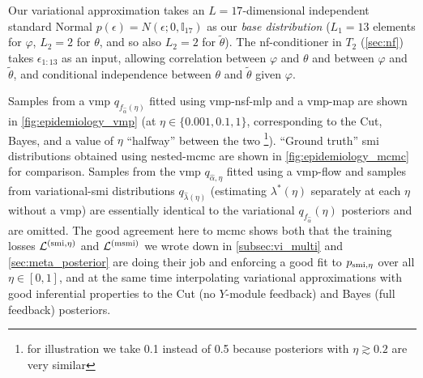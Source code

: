 Our variational approximation takes an $L=17$-dimensional independent standard Normal $p(\epsilon)=N(\epsilon; 0,\mathbb{I}_{17})$ as our \emph{base distribution} ($L_1=13$ elements for $\varphi$, $L_2=2$ for $\theta$, and so also $L_2=2$ for $\tilde\theta$).
The \acrshort*{nf}-conditioner in $T_2$ (\cref{sec:nf}) takes $\epsilon_{1:13}$ as an input, allowing correlation between $\varphi$ and $\theta$ and between $\varphi$ and $\tilde\theta$, and conditional independence between $\theta$ and $\tilde\theta$ given $\varphi$. 

Samples from a \acrshort*{vmp} $q_{f_{\hat\alpha}(\eta)}$ fitted using \acrshort*{vmp}-\acrshort*{nsf}-\acrshort*{mlp} and a \acrshort*{vmp}-map are shown in  \cref{fig:epidemiology_vmp} (at $\eta\in \{0.001,0.1,1\}$, corresponding to the Cut, Bayes, and a value of $\eta$ ``halfway'' between the two \footnote{for illustration we take 0.1 instead of 0.5 because posteriors with $\eta	\gtrsim 0.2 $ are very similar}). ``Ground truth'' \acrshort*{smi} distributions obtained using nested-\acrshort*{mcmc} \citep{Plummer2015cut,Carmona2020smi} are shown in \cref{fig:epidemiology_mcmc} for comparison. Samples from the \acrshort*{vmp} $q_{\hat\alpha,\eta}$ fitted using a \acrshort*{vmp}-flow and samples from variational-\acrshort*{smi} distributions $q_{\hat\lambda(\eta)}$ (estimating $\lambda^*(\eta)$ separately at each $\eta$ without a \acrshort*{vmp}) are essentially identical to the variational $q_{f_{\hat\alpha}}(\eta)$ posteriors and are omitted. The good agreement here to \acrshort*{mcmc} shows both that the training losses $\mathcal{L}^{(\operatorname{\text{smi}},\eta)}$ and $\mathcal{L}^{(\operatorname{\text{msmi}})}$ we wrote down in \cref{subsec:vi_multi} and \cref{sec:meta_posterior} are doing their job and enforcing a good fit to $p_{\operatorname{\text{smi}},\eta}$ over all $\eta\in [0,1]$, and at the same time interpolating variational approximations with good inferential properties to the Cut (no $Y$-module feedback) and Bayes (full feedback) posteriors.


